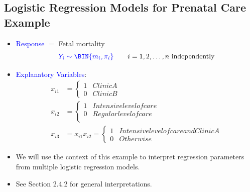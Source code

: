 \documentclass[oneside]{book}\usepackage[]{graphicx}\usepackage[svgnames]{xcolor}
\begin{document}
\subsection*{Logistic Regression Models for Prenatal Care Example}
\begin{itemize}
      \item \textcolor{Blue}{Response} $ = $ Fetal mortality
            \[ \textcolor{Blue}{Y_i \sim \BIN{m_i,\pi_i}}\qquad\text{$i=1,2,\ldots,n$ independently} \]
      \item \textcolor{Blue}{Explanatory Variables}:
            \begin{align*}
                  x_{i1} & =\begin{cases*}
                                  1 & Clinic A \\
                                  0 & Clinic B
                            \end{cases*}                                         \\
                  x_{i2} & =\begin{cases*}
                                  1 & Intensive level of care \\
                                  0 & Regular level of care   \\
                            \end{cases*}                           \\
                  x_{i3} & =x_{i1}x_{i2}=\begin{cases*}
                                               1 & Intensive level of care and Clinic A \\
                                               0 & Otherwise
                                         \end{cases*}
            \end{align*}
      \item We will use the context of this example to interpret regression parameters from
            multiple logistic regression models.
      \item See Section 2.4.2 for general interpretations.
\end{itemize}
\end{document}
